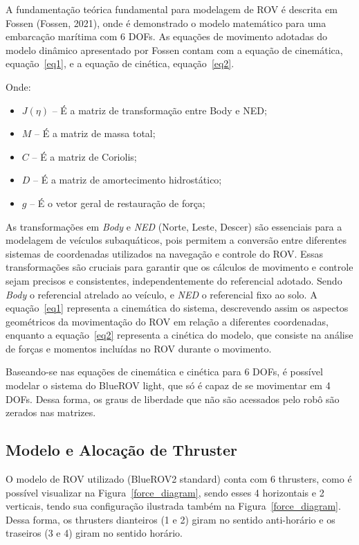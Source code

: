 \documentclass[../main.tex]{subfiles}
\begin{document}
A fundamentação teórica fundamental para modelagem de ROV é descrita em Fossen (Fossen, 2021), onde é demonstrado o modelo matemático para uma embarcação marítima com 6 DOFs. As equações de movimento adotadas do modelo dinâmico apresentado por Fossen contam com a equação de cinemática, equação~\ref{eq1}, e a equação de cinética, equação~\ref{eq2}.

Onde:
\begin{itemize}
    \item $J(\eta)$ -- É a matriz de transformação entre Body e NED;
    \item $M$ -- É a matriz de massa total;
    \item $C$ -- É a matriz de Coriolis;
    \item $D$ -- É a matriz de amortecimento hidrostático;
    \item $g$ -- É o vetor geral de restauração de força;
\end{itemize}


As transformações em \textit{Body} e \textit{NED} (Norte, Leste, Descer) são essenciais para a modelagem de veículos subaquáticos, pois permitem a conversão entre diferentes sistemas de coordenadas utilizados na navegação e controle do ROV. Essas transformações são cruciais para garantir que os cálculos de movimento e controle sejam precisos e consistentes, independentemente do referencial adotado. Sendo \textit{Body} o referencial atrelado ao veículo, e \textit{NED} o referencial fixo ao solo.
A equação~\ref{eq1} representa a cinemática do sistema, descrevendo assim os aspectos geométricos da movimentação do ROV em relação a diferentes coordenadas, enquanto a equação~\ref{eq2} representa a cinética do modelo, que consiste na análise de forças e momentos incluídas no ROV durante o movimento.

Baseando-se nas equações de cinemática e cinética para 6 DOFs, é possível modelar o sistema do BlueROV light, que só é capaz de se movimentar em 4 DOFs. Dessa forma, os graus de liberdade que não são acessados pelo robô são zerados nas matrizes.

\subsection{Modelo e Alocação de Thruster}
O modelo de ROV utilizado (BlueROV2 standard) conta com 6 thrusters, como é possível visualizar na Figura~\ref{force_diagram}, sendo esses 4 horizontais e 2 verticais, tendo sua configuração ilustrada também na Figura~\ref{force_diagram}. Dessa forma, os thrusters dianteiros (1 e 2) giram no sentido anti-horário e os traseiros (3 e 4) giram no sentido horário.
\end{document}
